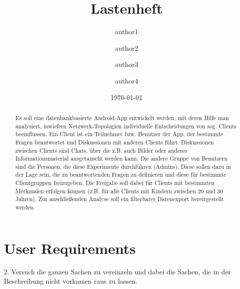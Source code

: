 \documentclass[a4paper, 10pt]{scrreprt}
\title{Lastenheft}
\author{author1 \and author2 \and author3 \and author4}
\date{\today}
\begin{document}
\maketitle



\tableofcontents


\begin{abstract}
 
Es soll eine datenbankbasierte Android-App entwickelt werden, 
mit deren Hilfe man analysiert, inwiefern Netzwerk-Topologien individuelle Entscheidungen von sog. Clients beeinflussen. 
Ein Client ist ein Teilnehmer bzw. Benutzer der App, der bestimmte Fragen beantwortet und Diskussionen mit anderen Clients führt. 
Diskussionen zwischen Clients sind Chats, über die z.B. auch Bilder oder anderes Informationsmaterial ausgetauscht werden kann. 
Die andere Gruppe von Benutzern sind die Personen, die diese Experimente durchführen (Admins). 
Diese sollen dazu in der Lage sein, die zu beantwortenden Fragen zu definieren und diese für bestimmte Clientgruppen freizugeben. 
Die Freigabe soll dabei für Clients mit bestimmten Merkmalen erfolgen können (z.B. für alle Clients mit Kindern zwischen 20 und 30 Jahren). 
Zur anschließenden Analyse soll ein filterbarer Datenexport bereitgestellt werden.

\end{abstract}











\printnoidxglossary[sort=word]




\part{User Requirements}

2. Versuch die ganzen Sachen zu vereinzeln und dabei die Sachen, die in der Beschreibung nicht vorkamen raus zu lassen.
\end{document}
